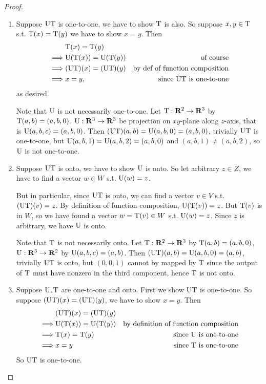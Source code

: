 \begin{proof} \ 
\begin{enumerate}
\item Suppose \(\mathrm{U}\mathrm{T}\) is one-to-one, we have to show \(\mathrm{T}\) is also.
So suppose \(x, y \in \mathrm{T}\) s.t. \(\mathrm{T}(x) = \mathrm{T}(y)\) we have to show \(x = y\).
Then
\begin{align*}
             & \mathrm{T}(x) = \mathrm{T}(y) \\
    \implies & \mathrm{U}(\mathrm{T}(x)) = \mathrm{U}(\mathrm{T}(y)) & \text{of course} \\
    \implies & (\mathrm{U}\mathrm{T})(x) = (\mathrm{U}\mathrm{T})(y) & \text{by def of function composition} \\
    \implies & x = y, & \text{since \(\mathrm{U}\mathrm{T}\) is one-to-one}
\end{align*}
as desired.

Note that \(\mathrm{U}\) is not necessarily one-to-one.
Let \(\mathrm{T} : \mathbf{R}^2 \to \mathbf{R}^3\) by \(\mathrm{T}(a, b) = (a, b, 0)\), \(\mathrm{U} : \mathbf{R}^3 \to \mathbf{R}^3\) be projection on \(xy\)-plane along \(z\)-axis, that is \(\mathrm{U}(a, b, c) = (a, b, 0)\).
Then \((\mathrm{U}\mathrm{T})(a, b) = \mathrm{U}(a, b, 0) = (a, b, 0)\), trivially \(\mathrm{U}\mathrm{T}\) is one-to-one, but \(\mathrm{U}(a, b, 1) = \mathrm{U}(a, b, 2) = (a, b, 0)\) and \((a, b, 1) \ne (a, b, 2)\), so \(\mathrm{U}\) is not one-to-one.

\item
Suppose \(\mathrm{U}\mathrm{T}\) is onto, we have to show \(\mathrm{U}\) is onto.
So let arbitrary \(z \in Z\), we have to find a vector \(w \in W\) s.t. \(\mathrm{U}(w) = z\).

But in particular, since \(\mathrm{U}\mathrm{T}\) is onto, we can find a vector \(v \in V\) s.t. \((\mathrm{U}\mathrm{T})(v) = z\).
By definition of function composition, \(\mathrm{U}(\mathrm{T}(v)) = z\).
But \(\mathrm{T}(v)\) is in \(W\), so we have found a vector \(w = \mathrm{T}(v) \in W\) s.t. \(\mathrm{U}(w) = z\).
Since \(z\) is arbitrary, we have \(\mathrm{U}\) is onto.

Note that \(\mathrm{T}\) is not necessarily onto.
Let \(\mathrm{T} : \mathbf{R}^2 \to \mathbf{R}^3\) by \(\mathrm{T}(a, b) = (a, b, 0)\), \(\mathrm{U} : \mathbf{R}^3 \to \mathbf{R}^2\) by \(\mathrm{U}(a, b, c) = (a, b)\).
Then \((\mathrm{U}\mathrm{T})(a, b) = \mathrm{U}(a, b, 0) = (a, b)\), trivially \(\mathrm{U}\mathrm{T}\) is onto, but \((0, 0, 1)\) cannot by mapped by \(\mathrm{T}\) since the output of \(\mathrm{T}\) must have nonzero in the third component, hence \(\mathrm{T}\) is not onto.

\item Suppose \(\mathrm{U}, \mathrm{T}\) are one-to-one and onto.
First we show \(\mathrm{U}\mathrm{T}\) is one-to-one.
So suppose \((\mathrm{U}\mathrm{T})(x) = (\mathrm{U}\mathrm{T})(y)\), we have to show \(x = y\).
Then
\begin{align*}
             & (\mathrm{U}\mathrm{T})(x) = (\mathrm{U}\mathrm{T})(y) \\
    \implies & \mathrm{U}(\mathrm{T}(x)) = \mathrm{U}(\mathrm{T}(y)) & \text{by definition of function composition} \\
    \implies & \mathrm{T}(x) = \mathrm{T}(y) & \text{since \(\mathrm{U}\) is one-to-one} \\
    \implies & x = y & \text{since \(\mathrm{T}\) is one-to-one}
\end{align*}
So \(\mathrm{U}\mathrm{T}\) is one-to-one.


\end{enumerate}
\end{proof}
